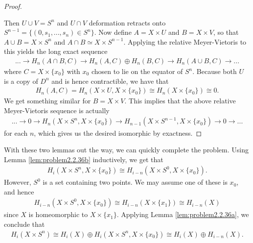 \begin{homework}[e]
\begin{prf}
\begin{proof}
\begin{center}
        \label{fig:prob7-1}
      \end{center}
      Then $U\cup V = S^n$ and $U\cap V$ deformation retracts onto $S^{n-1} = \{(0,s_1,...,s_n) \in S^n\}$. Now define $A = X\times U$ and $B = X\times V$, so that $A\cup B = X\times S^n$ and $A\cap B \simeq X\times S^{n-1}$. Applying the relative Meyer-Vietoris to this yields the long exact sequence
      \begin{align*}
        ... \to H_n(A\cap B, C) \to H_n(A,C) \oplus H_n(B,C) \to H_n(A\cup B,C) \to ...
      \end{align*}
      where $C = X\times \{x_0\}$ with $x_0$ chosen to lie on the equator of $S^n$. Because both $U$ is a copy of $D^n$ and is hence contractible, we have that
      \begin{align*}
        H_n(A,C) = H_n(X\times U, X\times \{x_0\}) \cong H_n(X\times \{x_0\}) \cong 0.
      \end{align*}
      We get something similar for $B = X\times V$. This implies that the above relative Meyer-Vietoris sequence is actually
      \begin{align*}
        ... \to 0 \to H_n(X\times S^{n}, X\times \{x_0\})\to H_{n-1}(X\times S^{n-1}, X\times \{x_0\})\to 0 \to ...
      \end{align*}
      for each $n$, which gives us the desired isomorphic by exactness.
    \end{proof}
    With these two lemmas out the way, we can quickly complete the problem. Using Lemma \ref{lem:problem2.2.36b} inductively, we get that
    \begin{align*}
      H_i(X\times S^n,X\times \{x_0\}) \cong H_{i - n}(X\times S^0,X\times \{x_0\}).
    \end{align*}
    However, $S^0$ is a set containing two points. We may assume one of these is $x_0$, and hence 
    \begin{align*}
      H_{i-n}(X\times S^0,X\times \{x_0\})\cong H_{i-n}(X\times \{x_1\})\cong H_{i-n}(X)
    \end{align*}
    since $X$ is homeomorphic to $X \times \{x_1\}$. Applying Lemma \ref{lem:problem2.2.36a}, we conclude that
    \begin{align*}
      H_i(X\times S^n) \cong H_i(X) \oplus H_i(X\times S^n,X\times \{x_0\}) \cong H_i(X) \oplus H_{i-n}(X).
    \end{align*}
  \end{prf}
\end{homework}

